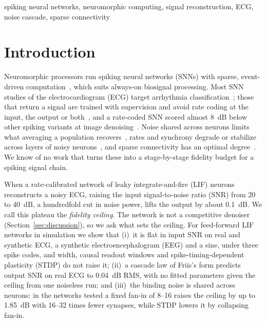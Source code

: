\documentclass[conference]{IEEEtran}
\newcommand{\dB}{~dB}
\begin{document}
\begin{IEEEkeywords}
spiking neural networks, neuromorphic computing, signal reconstruction,
ECG, noise cascade, sparse connectivity
\end{IEEEkeywords}

\section{Introduction}

Neuromorphic processors run spiking neural networks (SNNs) with sparse,
event-driven computation~\cite{davies2018loihi}, which suits always-on
biosignal processing. Most SNN studies of the electrocardiogram (ECG) target
arrhythmia classification~\cite{choi2024biomedical}; those that return a signal
are trained with supervision and avoid rate coding at the input, the output or
both~\cite{ren2026dcpa,henkes2024regression}, and a rate-coded SNN scored
almost 8~dB below other spiking variants at image
denoising~\cite{castagnetti2023spiden}. Noise shared across neurons limits what
averaging a population
recovers~\cite{zohary1994correlated,morenobote2014information,kanitscheider2015origin},
rates and synchrony degrade or stabilize across layers of noisy
neurons~\cite{diesmann1999stable,vanrossum2002fast}, and sparse connectivity
has an optimal degree~\cite{litwinkumar2017optimal}. We know of no work that
turns these into a stage-by-stage fidelity budget for a spiking signal chain.

When a rate-calibrated network of leaky integrate-and-fire (LIF) neurons
reconstructs a noisy ECG, raising the input signal-to-noise ratio (SNR) from 20
to 40\dB{}, a hundredfold cut in noise power, lifts the output by about
0.1\dB. We call this plateau the \emph{fidelity ceiling}. The network is not a
competitive denoiser (Section~\ref{sec:discussion}), so we ask what sets the
ceiling. For feed-forward LIF networks in simulation we show that (i)~it is
flat in input SNR on real and synthetic ECG, a synthetic electroencephalogram
(EEG) and a sine, under three spike codes, and width, causal readout windows
and spike-timing-dependent plasticity (STDP) do not raise it; (ii)~a cascade
law of Friis's form predicts output SNR on real ECG to 0.04\dB{} RMS, with no
fitted parameters given the ceiling from one noiseless run; and (iii)~the
binding noise is shared across neurons: in the networks tested a fixed fan-in
of 8--16 raises the ceiling by up to 1.85\dB{} with 16--32 times fewer
synapses, while STDP lowers it by collapsing fan-in.
\end{document}
